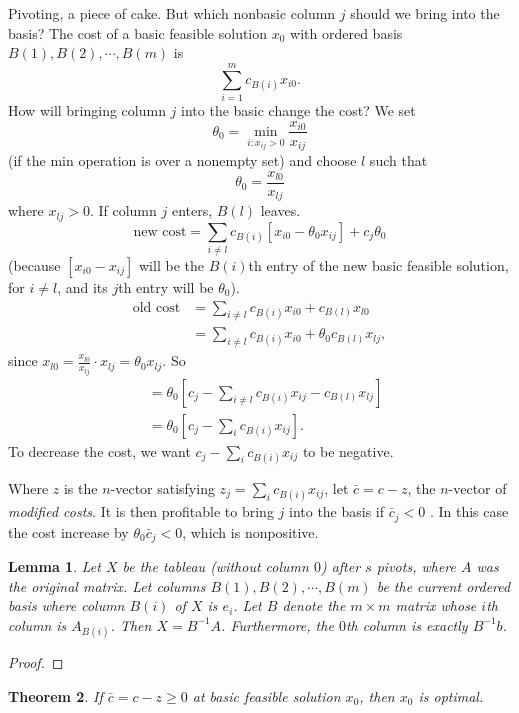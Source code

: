 \documentclass[11pt]{article} %
\theoremstyle{plain}%
\newtheorem{thm}{Theorem}[section]
\newtheorem{lem}[thm]{Lemma}
\theoremstyle{definition}
\theoremstyle{remark}
\begin{document}
Pivoting, a piece of cake. But which nonbasic column $j$ should we bring into the basis? 
The cost of a basic feasible solution $x_0$ with ordered basis $B(1), B(2), \cdots, B(m)$ is 
$$ \sum_{i=1}^{m} c_{B(i)} x_{i0}. $$ 
How will bringing column $j$ into the basic change the cost? We set
$$ \theta_0 = \min_{i:x_{ij}>0} \frac{x_{i0}}{x_{ij}}$$
(if the min operation is over a nonempty set) and choose $l$ such that
$$ \theta_0 = \frac{x_{l0}}{x_{lj}}$$
where $x_{lj}>0$. If column $j$ enters, $B(l)$ leaves. 
$$ \text{new cost} = \sum_{i\neq l} c_{B(i)} [x_{i0} - \theta_0 x_{ij}] + c_j \theta_0$$
(because $[x_{i0} - x_{ij}]$ will be the $B(i)$th entry of the new basic feasible solution, for 
$i \neq l$, and its $j$th entry will be $\theta_0$). 
\begin{align*}
\text{old cost} &= \sum_{i\neq l} c_{B(i)} x_{i0} + c_{B(l)} x_{l0} \\
&= \sum_{i\neq l} c_{B(i)} x_{i0} + \theta_0 c_{B(l)} x_{lj}, 
\end{align*}
since $x_{l0} = \frac{x_{l0}}{x_{lj}}\cdot x_{lj} = \theta_0 x_{lj}$. 
So
\begin{align*}
[\text{new cost} - \text{old cost}] &= \theta_0 [c_j - \sum_{i\neq l} c_{B(i)} x_{ij} - c_{B(l)} x_{lj}]\\
&= \theta_0 [c_j - \sum_i c_{B(i)} x_{ij}]. 
\end{align*}
To decrease the cost, we want $c_j - \sum_i c_{B(i)} x_{ij}$ to be negative. 

Where $z$ is the $n$-vector satisfying $z_j = \sum_i c_{B(i)} x_{ij}$, let $\bar{c} = c - z$, 
the $n$-vector of \emph{modified costs}. It is then profitable to bring $j$ into the basis if 
$\bar{c}_j<0$ . In this case the cost increase by $\theta_0 \bar{c}_j<0$, which is nonpositive. 

\begin{lem}
Let $X$ be the tableau (without column $0$) after $s$ pivots, where $A$ was the original matrix. 
Let columns $B(1), B(2), \cdots, B(m)$ be the current ordered basis where column $B(i)$ of $X$ 
is $e_i$. Let $B$ denote the $m\times m$ matrix whose $i$th column is $A_{B(i)}$. 
Then $X = B^{-1} A$. Furthermore, the $0$th column is exactly $B^{-1}b$. 
\end{lem}

\begin{proof}

\end{proof}

\begin{thm}
If $\bar{c} = c - z \geq 0$ at basic feasible solution $x_0$, then $x_0$ is optimal. 
\end{thm}
\end{document}
